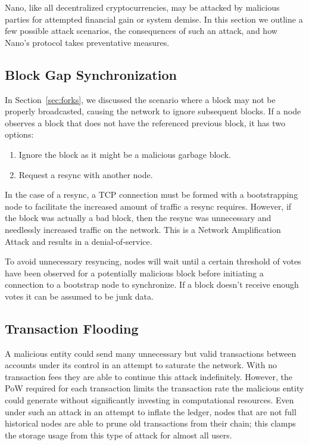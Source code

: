 Nano, like all decentralized cryptocurrencies, may be attacked by malicious parties for attempted financial gain or system demise. In this section we outline a few possible attack scenarios, the consequences of such an attack, and how Nano's protocol takes preventative measures.

\subsection{Block Gap Synchronization}
In Section~\ref{sec:forks}, we discussed the scenario where a block may not be properly broadcasted, causing the network to ignore subsequent blocks. If a node observes a block that does not have the referenced previous block, it has two options:
\begin{enumerate}
  \item Ignore the block as it might be a malicious garbage block.
  \item Request a resync with another node.
\end{enumerate}
In the case of a resync, a TCP connection must be formed with a bootstrapping node to facilitate the increased amount of traffic a resync requires. However, if the block was actually a bad block, then the resync was unnecessary and needlessly increased traffic on the network. This is a Network Amplification Attack and results in a denial-of-service.

To avoid unnecessary resyncing, nodes will wait until a certain threshold of votes have been observed for a potentially malicious block before initiating a connection to a bootstrap node to synchronize. If a block doesn't receive enough votes it can be assumed to be junk data.

\subsection{Transaction Flooding}\label{sec:transaction_flooding}
A malicious entity could send many unnecessary but valid transactions between accounts under its control in an attempt to saturate the network. With no transaction fees they are able to continue this attack indefinitely. However, the PoW required for each transaction limits the transaction rate the malicious entity could generate without significantly investing in computational resources. Even under such an attack in an attempt to inflate the ledger, nodes that are not full historical nodes are able to prune old transactions from their chain; this clamps the storage usage from this type of attack for almost all users.

